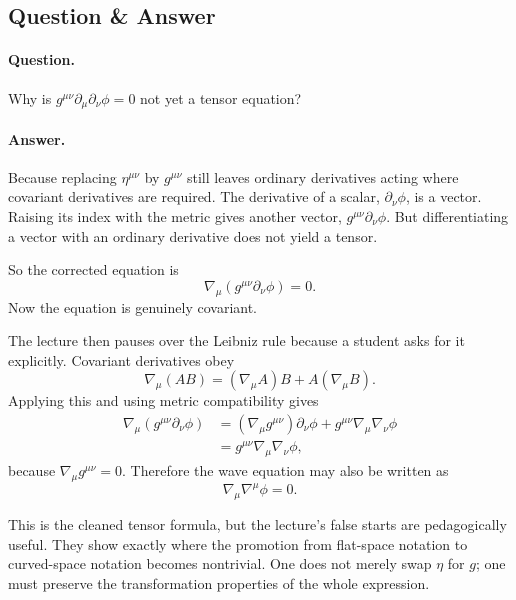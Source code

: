 \subsection{Question \& Answer}

\paragraph{Question.} Why is \(g^{\mu\nu}\partial_\mu\partial_\nu\phi=0\) not yet a tensor equation?

\paragraph{Answer.} Because replacing \(\eta^{\mu\nu}\) by \(g^{\mu\nu}\) still leaves ordinary derivatives acting where covariant derivatives are required. The derivative of a scalar, \(\partial_\nu\phi\), is a vector. Raising its index with the metric gives another vector, \(g^{\mu\nu}\partial_\nu\phi\). But differentiating a vector with an ordinary derivative does not yield a tensor.

So the corrected equation is
\begin{equation}
\nabla_\mu\!\left(g^{\mu\nu}\partial_\nu\phi\right)=0.
\end{equation}
Now the equation is genuinely covariant.

The lecture then pauses over the Leibniz rule because a student asks for it explicitly. Covariant derivatives obey
\begin{equation}
\nabla_\mu(AB)=(\nabla_\mu A)B+A(\nabla_\mu B).
\end{equation}
Applying this and using metric compatibility gives
\begin{align}
\nabla_\mu\!\left(g^{\mu\nu}\partial_\nu\phi\right)
&=
(\nabla_\mu g^{\mu\nu})\partial_\nu\phi
+
g^{\mu\nu}\nabla_\mu\nabla_\nu\phi \\
&=
g^{\mu\nu}\nabla_\mu\nabla_\nu\phi,
\end{align}
because \(\nabla_\mu g^{\mu\nu}=0\). Therefore the wave equation may also be written as
\begin{equation}
\nabla_\mu\nabla^\mu\phi=0.
\end{equation}

This is the cleaned tensor formula, but the lecture's false starts are pedagogically useful. They show exactly where the promotion from flat-space notation to curved-space notation becomes nontrivial. One does not merely swap \(\eta\) for \(g\); one must preserve the transformation properties of the whole expression.

